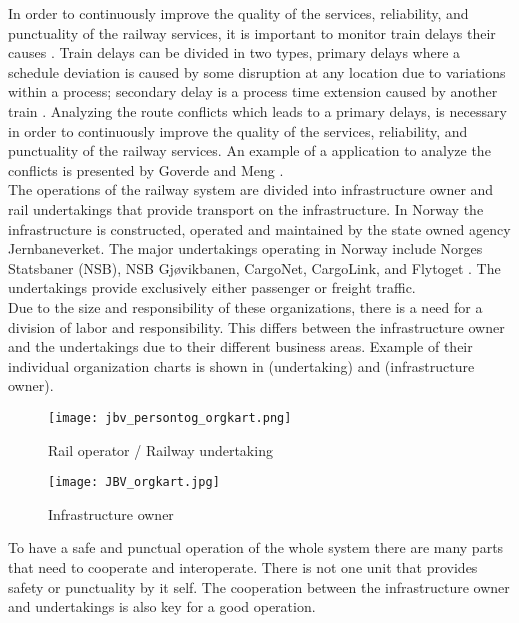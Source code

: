 In order to continuously improve the quality of the
services, reliability, and punctuality of the railway services, it is important
to monitor train delays their causes  \cite{goverde2011advanced}. 
Train delays can be divided in two types, primary delays where a schedule 
deviation is caused by some disruption at any location due to variations 
within a process; secondary delay is a process time extension caused by 
another train \cite{goverde2005punctuality}.
Analyzing the route conflicts which leads to a primary delays, is necessary in
order to continuously improve the quality of the services, reliability, and 
punctuality of the railway services. An example of a application to analyze the
conflicts is presented by Goverde and Meng \cite{goverde2011advanced}.\\

The operations of the railway system are divided into infrastructure owner and 
rail undertakings that provide transport on the infrastructure. In Norway the 
infrastructure is constructed, operated and maintained by the state owned 
agency Jernbaneverket. The major undertakings operating in Norway  include 
Norges Statsbaner (NSB), NSB Gjøvikbanen, CargoNet, CargoLink, and Flytoget \cite{ wiki:NorwegianRailway}. The undertakings provide exclusively either passenger 
or freight traffic.\\

Due to the size and responsibility of these organizations, there is a need for 
a division of labor and responsibility. This differs between the 
infrastructure owner and the undertakings due to their different business 
areas. Example of their individual organization charts is shown in  (undertaking) and  (infrastructure owner).

\begin{figure}[!htbp]
	\texttt{[image: jbv\_persontog\_orgkart.png]}
	\caption[Rail operator / Railway undertaking]{Rail operator / Railway undertaking \cite{sintefPresis}}
	\label{fig:jbv_undertaking_org_map}
\end{figure}

\begin{figure}[!htbp]
	\texttt{[image: JBV\_orgkart.jpg]}
	\caption[Infrastructure owner]{Infrastructure owner \cite{jernbaneverketOrganisasjon}}
	\label{fig:jbv_infrastructure_org_map}
\end{figure}

To have a safe and punctual operation of the whole system there are
many parts that need to cooperate and interoperate. There is not one unit that
provides safety or punctuality by it self. The cooperation between the 
infrastructure owner and undertakings is also key for a good operation. 


